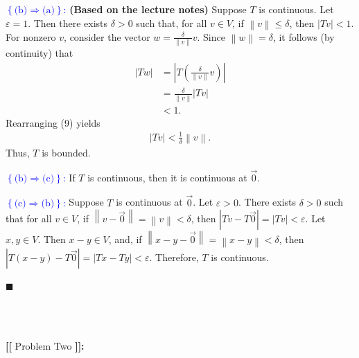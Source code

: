 \documentclass[12pt]{article}
\newcommand\norm[1]{\left\lVert#1\right\rVert}
\begin{document}
\pagebreak

\noindent \textcolor{blue}{$\left\lbrace \text{(b)} \Rightarrow \text{(a)} \right\rbrace$:} \textbf{(Based on the lecture notes)} Suppose $T$ is continuous. Let $\varepsilon = 1$. Then there exists $\delta>0$ such that, for all $v\in V$, if $\norm{v}\leq \delta$, then $|Tv|<1.$ For nonzero $v$, consider the vector $w=\frac{\delta}{\norm{v}}v.$ Since $\norm{w} = \delta$, it follows (by continuity) that
\begin{align}
    |Tw| &= \left|T\left(\frac{\delta}{\norm{v}}v\right)\right| \\
    &= \frac{\delta}{\norm{v}}|Tv| \\
    &< 1.
\end{align}
Rearranging (9) yields 
\begin{align}
    |Tv| < \frac{1}{\delta}\norm{v}.
\end{align}
Thus, $T$ is bounded.

\vspace{5mm}

\noindent \textcolor{blue}{$\left\lbrace \text{(b)} \Rightarrow \text{(c)} \right\rbrace$:} If $T$ is continuous, then it is continuous at $\vec{0}$.

\vspace{5mm}

\noindent \textcolor{blue}{$\left\lbrace \text{(c)} \Rightarrow \text{(b)} \right\rbrace$:} Suppose $T$ is continuous at $\vec{0}$. Let $\varepsilon>0$. There exists $\delta>0$ such that for all $v\in V$, if $\norm{v-\vec{0}} = \norm{v} <\delta$, then $|Tv-T\vec{0}| = |Tv|<\varepsilon.$ Let $x,y\in V$. Then $x-y\in V$, and, if $\norm{x-y-\vec{0}} = \norm{x-y} < \delta$, then $|T(x-y)-T\vec{0}| = |Tx-Ty|<\varepsilon$. Therefore, $T$ is continuous. 

\hfill$\blacksquare$

\vfill

\begin{center}
\\
\vspace{2mm}
\vspace{-0.65cm}
\hrulefill \\
\vspace{-0.95cm}
\hrulefill
\end{center}

\pagebreak

\noindent \textbf{{\huge [}{\Large [}} Problem Two \textbf{{\Large ]}{\huge ]}}{\Large \textbf{:}}
\end{document}
